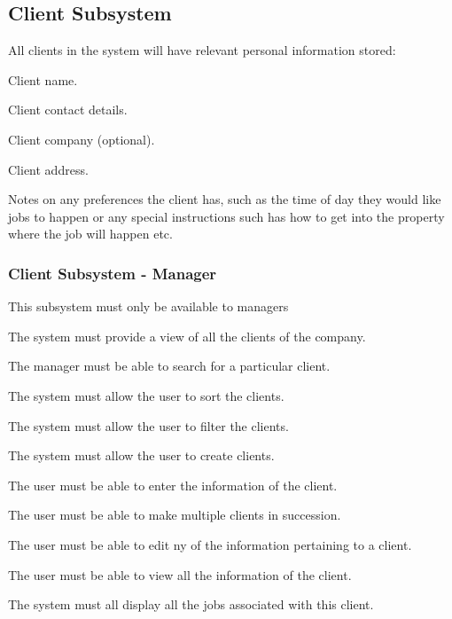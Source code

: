 \documentclass{article}
\begin{document}
	
	\subsection*{Client Subsystem}	
	\begin{list}{R.}{}
		\item All clients in the system will have relevant personal information stored:
		\begin{list}{R.}{}
			\item Client name.
			\item Client contact details.
			\item Client company (optional).
			\item Client address.
			\item Notes on any preferences the client has, such as the time of day they would like jobs to happen or any special instructions such has how to get into the property where the job will happen etc.
		\end{list}
	\end{list}
	\subsubsection*{Client Subsystem - Manager}	
	\begin{list}{R.}{}
		\item This subsystem must only be available to managers
		\item The system must provide a view of all the clients of the company.		
		\item The manager must be able to search for a particular client.
		\item The system must allow the user to sort the clients.
		\item The system must allow the user to filter the clients.
		\item The system must allow the user to create clients.
		\begin{list}{R.}{}
			\item The user must be able to enter the information of the client.
			\item The user must be able to make multiple clients in succession.
		\end{list}
		\item The user must be able to edit ny of the information pertaining to a client.
		\item The user must be able to view all the information of the client.
		\item The system must all display all the jobs associated with this client.
	\end{list}
\end{document}
